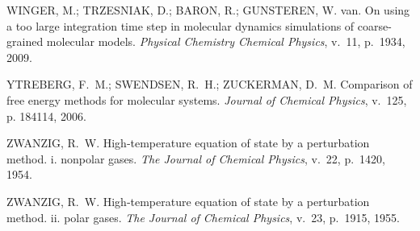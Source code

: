 \documentclass[
	12pt,				%
	openany,			%
	oneside,			%
	a4paper,			%
	english,			%
	brazil				%
	]{abntex2}
\begin{document}
\begin{thebibliography}{}
{WINGER, M.; TRZESNIAK, D.; BARON, R.; GUNSTEREN, W. van. On using a too large
  integration time step in molecular dynamics simulations of coarse-grained
  molecular models.
\emph{Physical Chemistry Chemical Physics}, v.~11, p.~1934, 2009.}

{YTREBERG, F.~M.; SWENDSEN, R.~H.; ZUCKERMAN, D.~M. Comparison of free energy
  methods for molecular systems.
\emph{Journal of Chemical Physics}, v.~125, p. 184114, 2006.}

{ZWANZIG, R.~W. High‐temperature equation of state by a perturbation method.
  i. nonpolar gases.
\emph{The Journal of Chemical Physics}, v.~22, p.~1420, 1954.}

{ZWANZIG, R.~W. High‐temperature equation of state by a perturbation method.
  ii. polar gases.
\emph{The Journal of Chemical Physics}, v.~23, p.~1915, 1955.}

\end{thebibliography}


%
%

\end{document}
